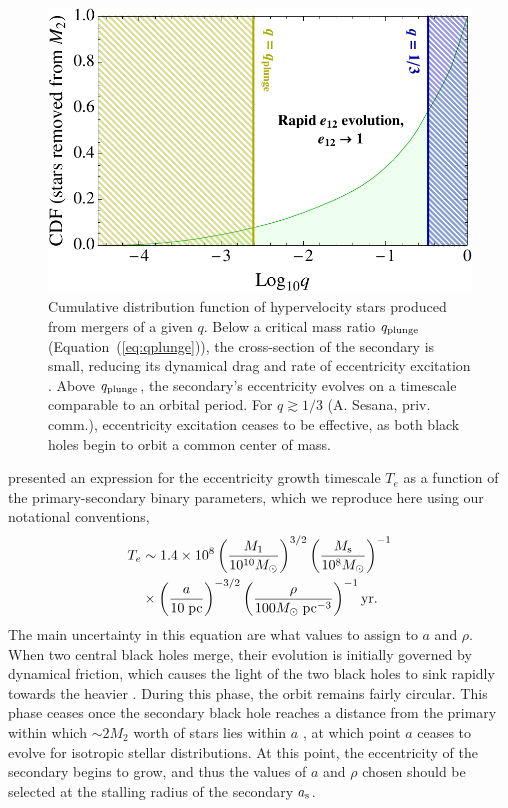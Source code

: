 \documentclass[a4paper,twocolumn]{emulateapj}
\begin{document}
\begin{figure}
\centering\includegraphics[width=\linewidth,clip=true]{qplunge}
\caption{Cumulative distribution function of hypervelocity stars produced from mergers of a given $q$. Below a critical mass ratio $q_{\rm plunge}$ (Equation~(\ref{eq:qplunge})), the cross-section of the secondary is small, reducing its dynamical drag and rate of eccentricity excitation \citep{Iwasawa:2011a}. Above $q_{\rm plunge}$, the secondary's eccentricity evolves on a timescale comparable to an orbital period. For $q \gtrsim 1/3$ (A. Sesana, priv. comm.), eccentricity excitation ceases to be effective, as both black holes begin to orbit a common center of mass.}
\label{fig:qplunge}
\end{figure}

\citet{Iwasawa:2011a} presented an expression for the eccentricity growth timescale $T_{e}$ as a function of the primary-secondary binary parameters, which we reproduce here using our notational conventions,
\begin{align}
T_{e} &\sim 1.4 \times 10^{8} \left(\frac{M_{1}}{10^{10} M_{\odot}}\right)^{3/2}\left(\frac{M_{\rm s}}{10^{8} M_{\odot}}\right)^{-1}\nonumber\\
&\times \left(\frac{a}{10\;{\rm pc}}\right)^{-3/2}\left(\frac{\rho}{100 M_{\odot}\;{\rm pc}^{-3}}\right)^{-1} {\rm yr}.
\label{eq:te}
\end{align}
The main uncertainty in this equation are what values to assign to $a$ and $\rho$. When two central black holes merge, their evolution is initially governed by dynamical friction, which causes the light of the two black holes to sink rapidly towards the heavier \citep{Dotti:2012a}. During this phase, the orbit remains fairly circular. This phase ceases once the secondary black hole reaches a distance from the primary within which $\sim 2 M_{2}$ worth of stars lies within $a$ \citep{Matsubayashi:2007a}, at which point $a$ ceases to evolve for isotropic stellar distributions. At this point, the eccentricity of the secondary begins to grow, and thus the values of $a$ and $\rho$ chosen should be selected at the stalling radius of the secondary $a_{\rm s}$.
\end{document}
